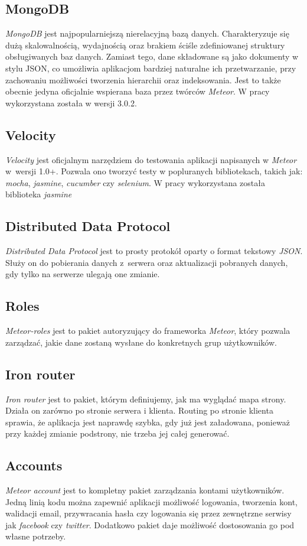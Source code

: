 \documentclass{xmgr}
\begin{document}
\subsection{MongoDB}
\indent \indent \indent \textit{MongoDB} jest najpopularniejszą nierelacyjną bazą danych. Charakteryzuje się dużą skalowalnością, wydajnością oraz brakiem ściśle zdefiniowanej struktury obsługiwanych baz danych. Zamiast tego, dane składowane są jako dokumenty w stylu JSON, co umożliwia aplikacjom bardziej naturalne ich przetwarzanie, przy zachowaniu możliwości tworzenia hierarchii oraz indeksowania. Jest to także obecnie jedyna oficjalnie wspierana baza przez twórców \textit{Meteor}.  W pracy wykorzystana została w wersji 3.0.2.
\subsection{Velocity}
\indent \indent \indent \textit{Velocity} jest oficjalnym narzędziem do testowania aplikacji napisanych w \textit{Meteor} w~wersji 1.0+. Pozwala ono tworzyć testy w popluranych bibliotekach, takich jak: \textit{mocha}, \textit{jasmine}, \textit{cucumber} czy \textit{selenium}. W pracy wykorzystana została biblioteka \textit{jasmine}
\subsection{Distributed Data Protocol}
\indent \indent \indent \textit{Distributed Data Protocol} jest to prosty protokół oparty o format tekstowy \textit{JSON}. Służy on do pobierania danych z~serwera oraz aktualizacji pobranych danych, gdy tylko na serwerze ulegają one zmianie.
\subsection{Roles}
\indent \indent \indent \textit{Meteor-roles} jest to pakiet autoryzujący do frameworka \textit{Meteor}, który pozwala zarządzać, jakie dane zostaną wysłane do konkretnych grup użytkowników.
\subsection{Iron router}
\indent \indent \indent \textit{Iron router} jest to pakiet, którym definiujemy, jak ma wyglądać mapa strony. Działa on zarówno po stronie serwera i klienta. Routing po stronie klienta sprawia, że aplikacja jest naprawdę szybka, gdy już jest załadowana, ponieważ przy każdej zmianie podstrony, nie trzeba jej całej generować.
\subsection{Accounts}
\indent \indent \indent \textit{Meteor account} jest to kompletny pakiet zarządzania kontami użytkowników. Jedną linią kodu można  zapewnić aplikacji możliwość logowania, tworzenia kont, walidacji email, przywracania hasła czy logowania się przez zewnętrzne serwisy jak \textit{facebook} czy \textit{twitter}. Dodatkowo pakiet daje możliwość dostosowania go pod własne potrzeby.
\end{document}
